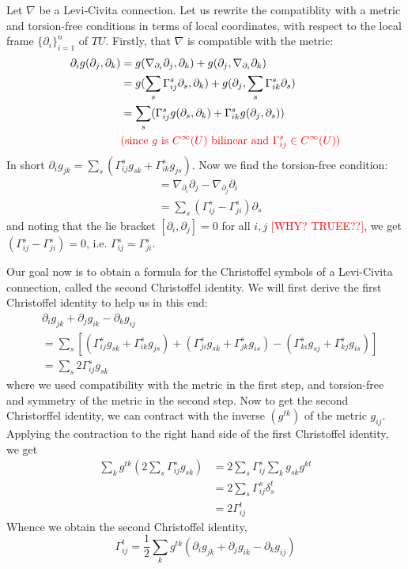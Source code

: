\documentclass[a4paper]{article}
\theoremstyle{definition} \newtheorem*{definition}{Definition}
\theoremstyle{definition} \newtheorem*{definitions}{Definitions}
\theoremstyle{plain} \newtheorem{theorem}{Theorem}[section]
\theoremstyle{plain} \newtheorem{proposition}[theorem]{Proposition}
\theoremstyle{plain} \newtheorem{corollary}[theorem]{Corollary}
\theoremstyle{plain} \newtheorem{lemma}[theorem]{Lemma}
\theoremstyle{plain} \newtheorem{example}[theorem]{Example}
\newcommand{\checkCorrect}[1]{\textcolor{red}{#1}}
\begin{document}
Let $\nabla$ be a Levi-Civita connection. Let us rewrite the compatiblity with a metric and torsion-free conditions in terms of local coordinates, with respect to the local frame $\{\partial_i\}_{i=1}^n$ of $TU$. Firstly, that $\nabla$ is compatible with the metric:
\begin{align*}
    \partial_i g(\partial_j, \partial_k) & = g(\nabla_{\partial_i}\partial_j, \partial_k) + g(\partial_j, \nabla_{\partial_i}\partial_k) \\
    & = g(\sum_s \Gamma^s_{ij}\partial_s, \partial_k)+g(\partial_j, \sum_s \Gamma^s_{ik}\partial_s)\\
    &= \sum_s (\Gamma^s_{ij}g(\partial_s, \partial_k)+\Gamma^s_{ik}g(\partial_j, \partial_s)) \\ & \textrm{\checkCorrect{(since $g$ is $C^\infty(U)$ bilinear and $\Gamma^s_{ij}\in C^\infty(U)$)}}
\end{align*}
In short $\partial_i g_{jk} = \sum_s (\Gamma^s_{ij}g_{sk}+\Gamma^s_{ik}g_{js})$. Now we find the torsion-free condition:
\begin{align*}
    [\partial_i, \partial_j] & = \nabla_{\partial_i}\partial_j - \nabla_{\partial_j}\partial_i \\
    & = \sum_s (\Gamma^s_{ij} - \Gamma^s_{ji})\partial_s
\end{align*}
and noting that the lie bracket $[\partial_i, \partial_j]=0$ for all $i,j$ \checkCorrect{[WHY? TRUEE??]}, we get $(\Gamma^s_{ij} - \Gamma^s_{ji})=0$, i.e. $\Gamma^s_{ij}=\Gamma^s_{ji}$.

Our goal now is to obtain a formula for the Christoffel symbols of a Levi-Civita connection, called the second Christoffel identity. We will first derive the first Christoffel identity to help us in this end:
\begin{align*}
    & \partial_i g_{jk} + \partial_j g_{ik} - \partial_k g_{ij} \\
    & = \sum_s [(\Gamma^s_{ij}g_{sk}+\Gamma^s_{ik}g_{js})+
    (\Gamma^s_{ji}g_{sk}+\Gamma^s_{jk}g_{is})-
    (\Gamma^s_{ki}g_{sj}+\Gamma^s_{kj}g_{is})] \\
    & = \sum_s 2\Gamma^s_{ij}g_{sk}
\end{align*}
where we used compatibility with the metric in the first step, and torsion-free and symmetry of the metric in the second step. Now to get the second Christorffel identity, we can contract with the inverse $(g^{tk})$ of the metric $g_{ij}$. Applying the contraction to the right hand side of the first Christoffel identity, we get
\begin{align*}
    \sum_k g^{tk}(2\sum_s \Gamma^s_{ij}g_{sk}) 
    & = 2\sum_s \Gamma^s_{ij}\sum_k g_{sk}g^{kt} \\
    & = 2 \sum_s \Gamma^s_{ij}\delta^t_s \\
    & = 2\Gamma^t_{ij}
\end{align*}
Whence we obtain the second Christoffel identity,
$$\Gamma^t_{ij} = \frac{1}{2}\sum_k g^{tk}(\partial_i g_{jk} + \partial_j g_{ik} - \partial_k g_{ij})$$
\end{document}

